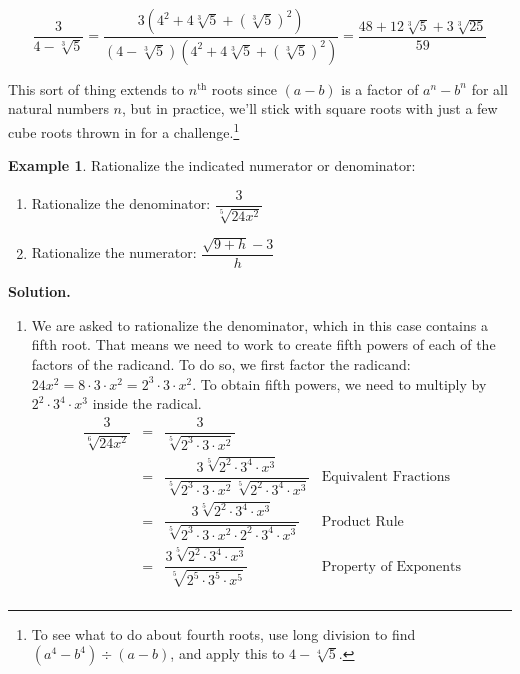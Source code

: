 \documentclass[11pt]{article}
\theoremstyle{definition}  %
\newtheorem{ex}{\bf Example}
\newcounter{HW}
\begin{document}
\[ \dfrac{3}{4 - \sqrt[3]{5}} = \dfrac{3(4^2 + 4\sqrt[3]{5} + (\sqrt[3]{5})^2)}{(4 - \sqrt[3]{5})(4^2 + 4\sqrt[3]{5} + (\sqrt[3]{5})^2)} = \dfrac{48 + 12\sqrt[3]{5}+ 3\sqrt[3]{25}}{59}\]

This sort of thing extends to $n^{\text{th}}$ roots since $(a-b)$ is a factor of $a^n - b^n$ for all natural numbers $n$, but in practice, we'll stick with square roots with just a few cube roots thrown in for a challenge.\footnote{To see what to do about fourth roots, use long division to find $(a^4 - b^4) \div (a-b)$, and apply this to $4 - \sqrt[4]{5}$.}

\begin{ex} \label{rationalizenumdenom} Rationalize the indicated numerator or denominator:

\begin{multicols}{2}
\begin{enumerate}

\item  Rationalize the denominator:  $\dfrac{3}{\sqrt[5]{24x^2}}$

\item  Rationalize the numerator: $\dfrac{\sqrt{9 + h} - 3}{h}$

\setcounter{HW}{\value{enumi}}

\end{enumerate}
\end{multicols}

{\bf Solution.}

\begin{enumerate}

\item We are asked to rationalize the denominator, which in this case contains a fifth root.  That means we need to work to create fifth powers of each of the factors of the radicand.  To do so, we first factor the radicand:  $24x^2 = 8 \cdot 3 \cdot x^2 = 2^3 \cdot 3 \cdot x^2$.  To obtain fifth powers, we need to multiply by $2^2 \cdot 3^4 \cdot x^3$ inside the radical.  \[ \begin{array}{rclr}

\dfrac{3}{\sqrt[6]{24x^2}} & = & \dfrac{3}{\sqrt[5]{2^3 \cdot 3 \cdot x^2}} & \\ [12pt]
                           & = & \dfrac{3 \sqrt[5]{2^2 \cdot 3^4 \cdot x^3}}{\sqrt[5]{2^3 \cdot 3 \cdot x^2}\sqrt[5]{2^2 \cdot 3^4 \cdot x^3}} & \text{Equivalent Fractions} \\[12pt]
												& = & \dfrac{3 \sqrt[5]{2^2 \cdot 3^4 \cdot x^3}}{\sqrt[5]{2^3 \cdot 3 \cdot x^2 \cdot 2^2 \cdot 3^4 \cdot x^3}} & \text{Product Rule} \\[12pt]
													& = & \dfrac{3 \sqrt[5]{2^2 \cdot 3^4 \cdot x^3}}{\sqrt[5]{2^5 \cdot 3^5 \cdot x^5}} & \text{Property of Exponents}\\[12pt]
													

\end{array}\]
\end{enumerate}
\end{ex}
\end{document}
